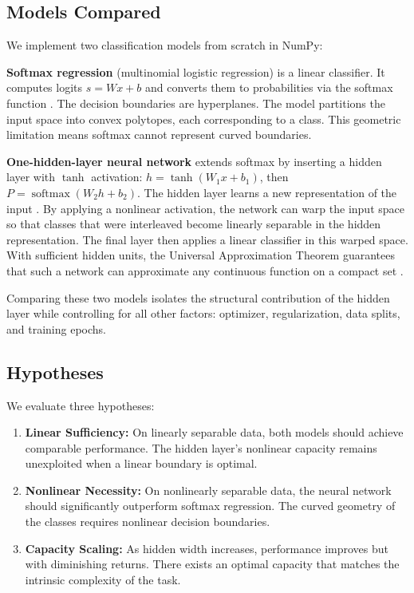 \documentclass[sigconf,screen,nonacm,nofonts]{acmart}
\begin{document}
\subsection{Models Compared}

We implement two classification models from scratch in NumPy:

\textbf{Softmax regression} (multinomial logistic regression) is a linear classifier. It computes logits \(s = Wx + b\) and converts them to probabilities via the softmax function \cite{murphy2022pml}. The decision boundaries are hyperplanes. The model partitions the input space into convex polytopes, each corresponding to a class. This geometric limitation means softmax cannot represent curved boundaries.

\textbf{One-hidden-layer neural network} extends softmax by inserting a hidden layer with \(\tanh\) activation: \(h = \tanh(W_1x + b_1)\), then \(P = \operatorname{softmax}(W_2h + b_2)\). The hidden layer learns a new representation of the input \cite{goodfellow2016deep}. By applying a nonlinear activation, the network can warp the input space so that classes that were interleaved become linearly separable in the hidden representation. The final layer then applies a linear classifier in this warped space. With sufficient hidden units, the Universal Approximation Theorem guarantees that such a network can approximate any continuous function on a compact set \cite{goodfellow2016deep}.

Comparing these two models isolates the structural contribution of the hidden layer while controlling for all other factors: optimizer, regularization, data splits, and training epochs.

\subsection{Hypotheses}

We evaluate three hypotheses:

\begin{enumerate}
    \item \textbf{Linear Sufficiency:} On linearly separable data, both models should achieve comparable performance. The hidden layer's nonlinear capacity remains unexploited when a linear boundary is optimal.
    \item \textbf{Nonlinear Necessity:} On nonlinearly separable data, the neural network should significantly outperform softmax regression. The curved geometry of the classes requires nonlinear decision boundaries.
    \item \textbf{Capacity Scaling:} As hidden width increases, performance improves but with diminishing returns. There exists an optimal capacity that matches the intrinsic complexity of the task.
\end{enumerate}
\end{document}

